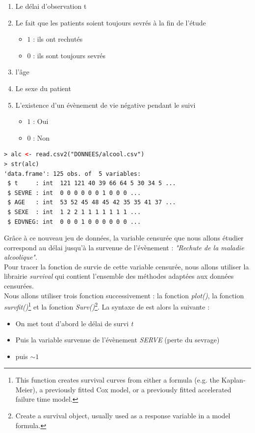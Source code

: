 \begin{enumerate}
\item Le délai d'observation t
\item Le fait que les patients soient toujours sevrés à la fin de l'étude 
\begin{itemize}
\item $1$ : ils ont rechutés
\item $0$ : ils sont toujours sevrés
\end{itemize}
\item l'âge
\item Le sexe du patient 
\item L'existence d'un évènement de vie négative pendant le suivi 
\begin{itemize}
\item $1$ : Oui 
\item $0$ : Non 
\end{itemize}
\end{enumerate}

\begin{lstlisting}[language=html]
> alc <- read.csv2("DONNEES/alcool.csv")
> str(alc)
'data.frame': 125 obs. of  5 variables:
 $ t     : int  121 121 40 39 66 64 5 30 34 5 ...
 $ SEVRE : int  0 0 0 0 0 0 1 0 0 0 ...
 $ AGE   : int  53 52 45 48 45 42 35 35 41 37 ...
 $ SEXE  : int  1 2 2 1 1 1 1 1 1 1 ...
 $ EDVNEG: int  0 0 0 1 0 0 0 0 0 0 ...
\end{lstlisting}

Grâce à ce nouveau jeu de données, la variable censurée que nous allons étudier correspond au délai jusqu'à la survenue de l'évènement : \textit{"Rechute de la maladie alcoolique"}.\newline
\\
Pour tracer la fonction de survie de cette variable censurée, nous allons utiliser la librairie \textit{survival} qui contient l'ensemble des méthodes adaptées aux données censurées.\newline
\\
Nous allons utiliser trois fonction successivement : la fonction \textit{plot()}, la fonction \textit{survfit()}\footnote{This function creates survival curves from either a formula (e.g. the Kaplan-Meier), a previously fitted Cox model, or a previously fitted accelerated failure time model.} et la fonction \textit{Surv()}\footnote{Create a survival object, usually used as a response variable in a model formula. }. La syntaxe de est alors la suivante : 
\begin{itemize}
\item On met tout d'abord le délai de survi \textit{t}
\item Puis la variable survenue de l'évènement \textit{SERVE} (perte du sevrage)
\item puis $\sim 1$
\end{itemize}



